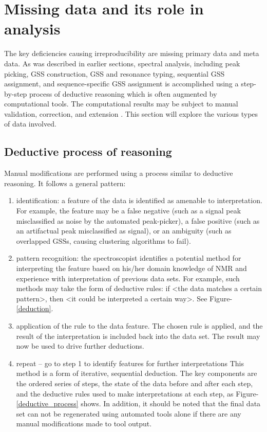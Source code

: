 \section{Missing data and its role in analysis}
The key deficiencies causing irreproducibility are missing primary data and 
meta data.  As was described in earlier sections, 
spectral analysis, including peak picking, GSS construction, GSS and resonance
typing, sequential GSS assignment, and sequence-specific GSS assignment is 
accomplished using a step-by-step process of deductive reasoning 
which is often augmented by computational tools.  The computational 
results may be subject to manual validation, correction, and extension
\cite{guerry2011automated}.  This section will explore the various types
of data involved.


\subsection{Deductive process of reasoning}
Manual modifications are performed using a process similar to deductive 
reasoning.  It follows a general pattern:
\begin{enumerate}
  \item identification: a feature of the data is identified as amenable to 
    interpretation.  For example, the feature may be a false negative (such as 
    a signal peak misclassified as noise by the automated peak-picker), a false 
    positive (such as an artifactual peak misclassified as signal), or an 
    ambiguity (such as overlapped GSSs, causing clustering algorithms to fail).
  \item pattern recognition: the spectroscopist identifies a potential method 
    for interpreting the feature based on his/her domain knowledge of NMR and 
    experience with interpretation of previous data sets.  For example, such 
    methods may take the form of deductive rules:  if <the data matches a 
    certain pattern>, then <it could be interpreted a certain way>. 
    See Figure-\ref{deduction}.
  \item application of the rule to the data feature.  The chosen rule is 
    applied, and the result of the interpretation is included back into the 
    data set.  The result may now be used to drive further deductions.
  \item repeat -- go to step 1 to identify features for further interpretations
    This method is a form of iterative, sequential deduction.  The key components 
    are the ordered series of steps, the state of the data before and after each 
    step, and the deductive rules used to make interpretations at each step, as
    Figure-\ref{deductive_process} shows.  In 
    addition, it should be noted that the final data set can not be regenerated 
    using automated tools alone if there are any manual modifications made to 
    tool output.
\end{enumerate}

